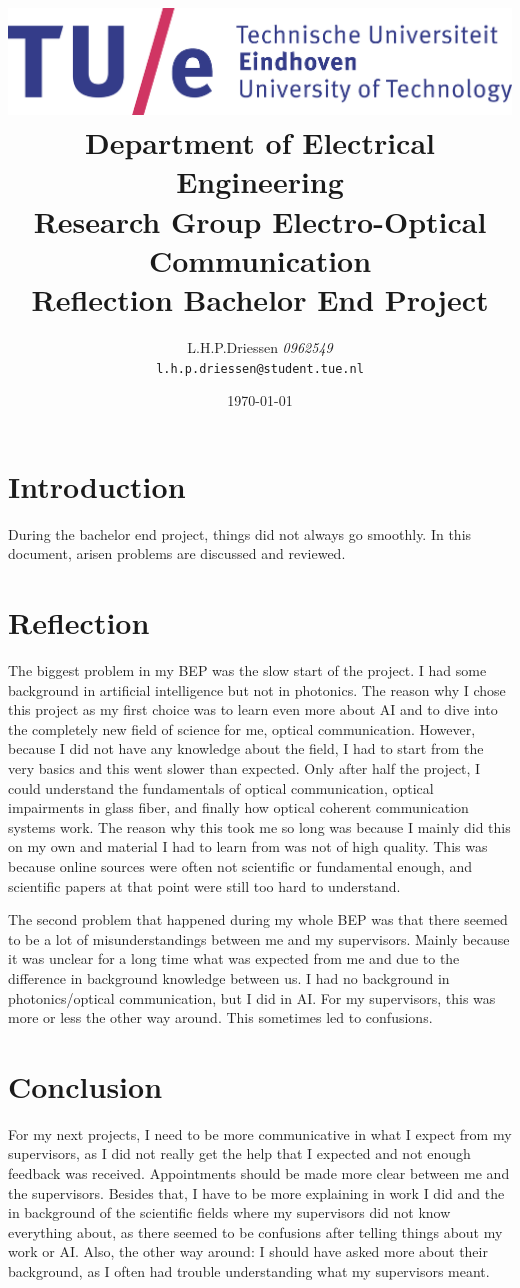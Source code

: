 \documentclass[a4paper]{article}
\title{\includegraphics[width=0.8\linewidth]{images/tue-logo-high}\\\large{Department of Electrical Engineering\\Research Group Electro-Optical Communication}\\\vspace{0.5cm}\LARGE{Reflection Bachelor End Project}}
\author{L.H.P.Driessen \textit{0962549}\\\texttt{l.h.p.driessen@student.tue.nl}}
\date{\today}
\begin{document}
\maketitle
\section{Introduction}
During the bachelor end project, things did not always go smoothly. In this document, arisen problems are discussed and reviewed.

\section{Reflection}
The biggest problem in my BEP was the slow start of the project. I had some background in artificial intelligence but not in photonics. The reason why I chose this project as my first choice was to learn even more about AI and to dive into the completely new field of science for me, optical communication. However, because I did not have any knowledge about the field, I had to start from the very basics and this went slower than expected. Only after half the project, I could understand the fundamentals of optical communication, optical impairments in glass fiber, and finally how optical coherent communication systems work. The reason why this took me so long was because I mainly did this on my own and material I had to learn from was not of high quality. This was because online sources were often not scientific or fundamental enough, and scientific papers at that point were still too hard to understand.

The second problem that happened during my whole BEP was that there seemed to be a lot of misunderstandings between me and my supervisors. Mainly because it was unclear for a long time what was expected from me and due to the difference in background knowledge between us. I had no background in photonics/optical communication, but I did in AI. For my supervisors, this was more or less the other way around. This sometimes led to confusions.

\section{Conclusion}
For my next projects, I need to be more communicative in what I expect from my supervisors, as I did not really get the help that I expected and not enough feedback was received. Appointments should be made more clear between me and the supervisors. Besides that, I have to be more explaining in work I did and the in background of the scientific fields where my supervisors did not know everything about, as there seemed to be confusions after telling things about my work or AI. Also, the other way around: I should have asked more about their background, as I often had trouble understanding what my supervisors meant.
\end{document}
